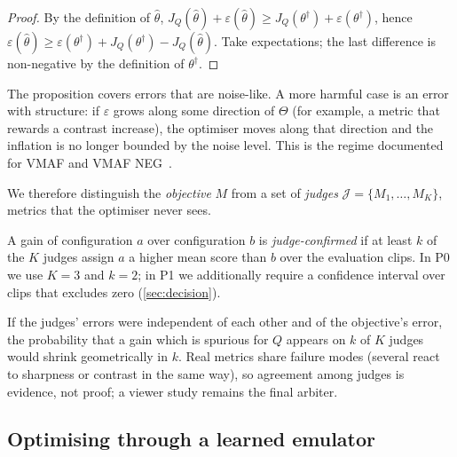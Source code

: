 \begin{proof}
By the definition of $\hat\theta$, $J_Q(\hat\theta)+\varepsilon(\hat\theta) \ge
J_Q(\theta^\dagger)+\varepsilon(\theta^\dagger)$, hence $\varepsilon(\hat\theta) \ge
\varepsilon(\theta^\dagger) + J_Q(\theta^\dagger)-J_Q(\hat\theta)$. Take expectations; the last
difference is non-negative by the definition of $\theta^\dagger$.
\end{proof}

The proposition covers errors that are noise-like. A more harmful case is an error with structure:
if $\varepsilon$ grows along some direction of $\Theta$ (for example, a metric that rewards a
contrast increase), the optimiser moves along that direction and the inflation is no longer bounded
by the noise level. This is the regime documented for VMAF and VMAF
NEG~\cite{zvezdakova2019hacking,siniukov2021hacking}.

We therefore distinguish the \emph{objective} $M$ from a set of \emph{judges}
$\mathcal{J}=\{M_1,\dots,M_K\}$, metrics that the optimiser never sees.

\begin{definition}
\label{def:confirmed}
A gain of configuration $a$ over configuration $b$ is \emph{judge-confirmed} if at least $k$ of the
$K$ judges assign $a$ a higher mean score than $b$ over the evaluation clips. In P0 we use $K=3$ and
$k=2$; in P1 we additionally require a confidence interval over clips that excludes zero
(\cref{sec:decision}).
\end{definition}

\begin{remark}
If the judges' errors were independent of each other and of the objective's error, the probability
that a gain which is spurious for $Q$ appears on $k$ of $K$ judges would shrink geometrically in
$k$. Real metrics share failure modes (several react to sharpness or contrast in the same way), so
agreement among judges is evidence, not proof; a viewer study remains the final arbiter.
\end{remark}

\subsection{Optimising through a learned emulator}
\label{sec:emulator-theory}

